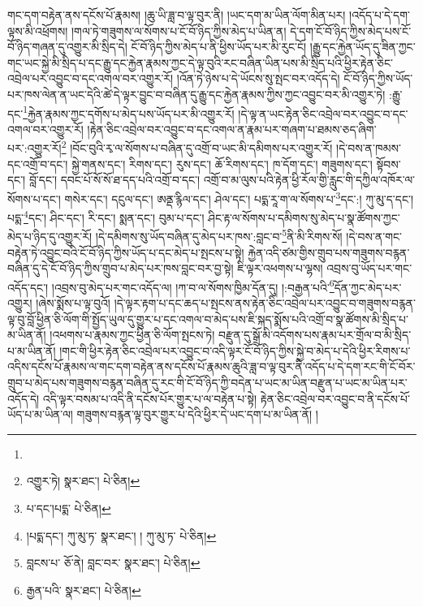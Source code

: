 གང་དག་བརྟེན་ནས་དངོས་པོ་རྣམས། །ཆུ་ཡི་ཟླ་བ་ལྟ་བུར་ནི། །ཡང་དག་མ་ཡིན་ལོག་མིན་པར། །འདོད་པ་དེ་དག་ལྟས་མི་འཕྲོགས། །གལ་ཏེ་གཟུགས་ལ་སོགས་པ་ངོ་བོ་ཉིད་ཀྱིས་མེད་པ་ཡིན་ན། དེ་དག་ངོ་བོ་ཉིད་ཀྱིས་མེད་པས་ངོ་བོ་ཉིད་གཞན་དུ་འགྱུར་མི་སྲིད་དེ། ངོ་བོ་ཉིད་ཀྱིས་མེད་པ་ནི་ཕྱིས་ཡོད་པར་མི་རུང་ངོ། །རྒྱུ་དང་རྐྱེན་ཡོད་དུ་ཟིན་ཀྱང་གང་ཡང་སྐྱེ་མི་སྲིད་པ་དང་རྒྱུ་དང་རྐྱེན་རྣམས་ཀྱང་དེ་ལྟ་བུའི་རང་བཞིན་ཡིན་པས་མི་སྲིད་པའི་ཕྱིར་རྟེན་ཅིང་འབྲེལ་པར་འབྱུང་བ་དང་འགལ་བར་འགྱུར་རོ། །འོན་ཏེ་ཉེས་པ་དེ་ཡོངས་སུ་སྤང་བར་འདོད་དེ། ངོ་བོ་ཉིད་ཀྱིས་ཡོད་པར་ཁས་ལེན་ན་ཡང་དེའི་ཚེ་དེ་ལྟར་བྱུང་བ་བཞིན་དུ་རྒྱུ་དང་རྐྱེན་རྣམས་ཀྱིས་ཀྱང་འབྱུང་བར་མི་འགྱུར་ཏེ། :རྒྱུ་དང་\footnote{}རྐྱེན་རྣམས་ཀྱང་དགོས་པ་མེད་པས་ཡོད་པར་མི་འགྱུར་རོ། །དེ་ལྟ་ན་ཡང་རྟེན་ཅིང་འབྲེལ་བར་འབྱུང་བ་དང་འགལ་བར་འགྱུར་རོ། །རྟེན་ཅིང་འབྲེལ་བར་འབྱུང་བ་དང་འགལ་ན་རྣམ་པར་གཞག་པ་ཐམས་ཅད་ཞིག་པར་:འགྱུར་རོ།\footnote{འགྱུར་ཏེ།  སྣར་ཐང་།  པེ་ཅིན། } །བོང་བུའི་རྭ་ལ་སོགས་པ་བཞིན་དུ་འགྲོ་བ་ཡང་མི་དམིགས་པར་འགྱུར་རོ། །དེ་བས་ན་ཁམས་དང་འགྲོ་བ་དང་། སྐྱེ་གནས་དང་། རིགས་དང་། རུས་དང་། ཆོ་རིགས་དང་། ཁ་དོག་དང་། གཟུགས་དང་། སྟོབས་དང་། བློ་དང་། དབང་པོ་སོ་སོ་ཐ་དད་པའི་འགྲོ་བ་དང་། འགྲོ་བ་མ་ལུས་པའི་རྟེན་ཕྱི་རོལ་གྱི་རླུང་གི་དཀྱིལ་འཁོར་ལ་སོགས་པ་དང་། གསེར་དང་། དངུལ་དང་། ཨནྡ་རྙིལ་དང་། ཤེལ་དང་། པདྨ་རཱ་ག་ལ་སོགས་པ་\footnote{པ་དང་།པདྨ་  པེ་ཅིན། }དང་:། ཀུ་མུ་ད་དང་། པདྨ་\footnote{།པདྨ་དང་། ཀུ་མུ་ཏ་  སྣར་ཐང་། ། ཀུ་མུ་ཏ་  པེ་ཅིན། }དང་། ཤིང་དང་། རི་དང་། སྨན་དང་། བུམ་པ་དང་། ཤིང་རྟ་ལ་སོགས་པ་དམིགས་སུ་མེད་པ་སྣ་ཚོགས་ཀྱང་མེད་པ་ཉིད་དུ་འགྱུར་རོ། །དེ་དམིགས་སུ་ཡོད་བཞིན་དུ་མེད་པར་ཁས་:བླང་བ་\footnote{བླངས་པ་  ཅོ་ནེ། བླང་བར་  སྣར་ཐང་།  པེ་ཅིན། }ནི་མི་རིགས་སོ། །དེ་བས་ན་གང་བརྟེན་ཏེ་འབྱུང་བའི་ངོ་བོ་ཉིད་ཀྱིས་ཡོད་པ་དང་མེད་པ་སྤངས་པ་སྟེ། རྐྱེན་འདི་ཙམ་གྱིས་གྲུབ་པས་གཟུགས་བརྙན་བཞིན་དུ་དེ་ངོ་བོ་ཉིད་ཀྱིས་གྲུབ་པ་མེད་པར་ཁས་བླང་བར་བྱ་སྟེ། ཇི་ལྟར་འཕགས་པ་ལྷས། འབྲས་བུ་ཡོད་པར་གང་འདོད་དང་། །འབྲས་བུ་མེད་པར་གང་འདོད་ལ། །ཀ་བ་ལ་སོགས་ཁྱིམ་དོན་དུ། །:བརྒྱན་པའི་\footnote{རྒྱན་པའི་  སྣར་ཐང་།  པེ་ཅིན། }དོན་ཀྱང་མེད་པར་འགྱུར། །ཞེས་སྨོས་པ་ལྟ་བུའོ། །དེ་ལྟར་རྟག་པ་དང་ཆད་པ་སྤངས་ནས་རྟེན་ཅིང་འབྲེལ་པར་འབྱུང་བ་གཟུགས་བརྙན་ལྟ་བུ་བློ་ཕྱིན་ཅི་ལོག་གི་སྤྱོད་ཡུལ་དུ་གྱུར་པ་དང་འགལ་བ་མེད་པས་ཇི་སྐད་སྨོས་པའི་འགྲོ་བ་སྣ་ཚོགས་མི་སྲིད་པ་མ་ཡིན་ནོ། །འཕགས་པ་རྣམས་ཀྱང་ཕྱིན་ཅི་ལོག་སྤངས་ཏེ། བརྫུན་དུ་སྒྲོ་མི་འདོགས་པས་རྣམ་པར་གྲོལ་བ་མི་སྲིད་པ་མ་ཡིན་ནོ། །གང་གི་ཕྱིར་རྟེན་ཅིང་འབྲེལ་པར་འབྱུང་བ་འདི་ལྟར་ངོ་བོ་ཉིད་ཀྱིས་སྐྱེ་བ་མེད་པ་དེའི་ཕྱིར་རིགས་པ་འདིས་དངོས་པོ་རྣམས་ལ་གང་དག་བརྟེན་ནས་དངོས་པོ་རྣམས་ཆུའི་ཟླ་བ་ལྟ་བུར་ནི་འདོད་པ་དེ་དག་རང་གི་ངོ་བོར་གྲུབ་པ་མེད་པས་གཟུགས་བརྙན་བཞིན་དུ་རང་གི་ངོ་བོ་ཉིད་ཀྱི་བདེན་པ་ཡང་མ་ཡིན་བརྫུན་པ་ཡང་མ་ཡིན་པར་འདོད་དེ། འདི་ལྟར་བསམ་པ་འདི་ནི་དངོས་པོར་གྱུར་པ་ལ་བརྟེན་པ་སྟེ། རྟེན་ཅིང་འབྲེལ་བར་འབྱུང་བ་ནི་དངོས་པོ་ཡོད་པ་མ་ཡིན་ལ། གཟུགས་བརྙན་ལྟ་བུར་གྱུར་པ་དེའི་ཕྱིར་དེ་ཡང་དག་པ་མ་ཡིན་ནོ། །
